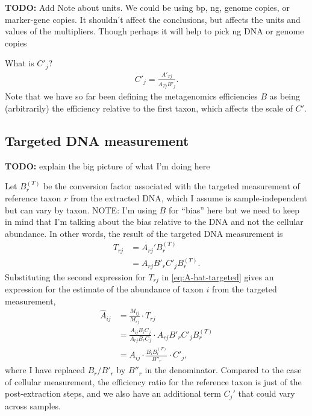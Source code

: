 \documentclass[
]{article}
\theoremstyle{definition}
\theoremstyle{definition}
\theoremstyle{definition}
\theoremstyle{definition}
\theoremstyle{remark}
\begin{document}
\textbf{TODO:} Add Note about units. We could be using bp, ng, genome copies, or marker-gene copies. It shouldn't affect the conclusions, but affects the units and values of the multipliers. Though perhaps it will help to pick ng DNA or genome copies

What is \(C'_j\)?
\begin{align}
  C'_j = \frac{A'_{Tj}}{A_{Tj} \bar{B}'_j}.
\end{align}
Note that we have so far been defining the metagenomics efficiencies \(B\) as being (arbitrarily) the efficiency relative to the first taxon, which affects the scale of \(C'\).

\hypertarget{targeted-dna-measurement}{%
\subsection{Targeted DNA measurement}\label{targeted-dna-measurement}}

\textbf{TODO:} explain the big picture of what I'm doing here

Let \(B^{(T)}_r\) be the conversion factor associated with the targeted measurement of reference taxon \(r\) from the extracted DNA, which I assume is sample-independent but can vary by taxon.
NOTE: I'm using \(B\) for ``bias'' here but we need to keep in mind that I'm talking about the bias relative to the DNA and not the cellular abundance.
In other words, the result of the targeted DNA measurement is
\begin{align}
  \label{eq:T-dna}
  T_{rj} 
  &= A_{rj}' B^{(T)}_r \\
  &= A_{rj} B'_r C'_j B^{(T)}_r.
\end{align}
Substituting the second expression for \(T_{rj}\) in \eqref{eq:A-hat-targeted} gives an expression for the estimate of the abundance of taxon \(i\) from the targeted measurement,
\begin{align}
  \label{eq:A-hat-targeted-dna}
  \hat A_{ij} 
  &= \frac{M_{ij}}{M_{rj}} \cdot T_{rj} \\
  &= \frac{A_{ij} B_i C_j}{A_{rj} B_r C_j} \cdot A_{rj} B'_r C'_j B^{(T)}_r \\
  &= A_{ij} \cdot \frac{B_i B^{(T)}_r}{B''_r} \cdot C'_j,
\end{align}
where I have replaced \(B_r / B'_r\) by \(B''_r\) in the denominator.
Compared to the case of cellular measurement, the efficiency ratio for the reference taxon is just of the post-extraction steps, and we also have an additional term \(C_j'\) that could vary across samples.
\end{document}
